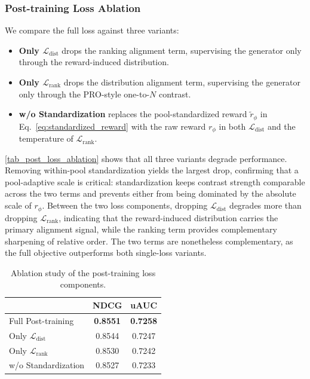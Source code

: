 \documentclass[sigconf]{acmart}
\begin{document}
\subsubsection{Post-training Loss Ablation}
We compare the full loss against three variants:
\begin{itemize}
    \item \textbf{Only $\mathcal{L}_{\mathrm{dist}}$} drops the ranking alignment term, supervising the generator only through the reward-induced distribution.
    \item \textbf{Only $\mathcal{L}_{\mathrm{rank}}$} drops the distribution alignment term, supervising the generator only through the PRO-style one-to-$N$ contrast.
    \item \textbf{w/o Standardization} replaces the pool-standardized reward $\tilde{r}_\phi$ in Eq.~\eqref{eq:standardized_reward} with the raw reward $r_\phi$ in both $\mathcal{L}_{\mathrm{dist}}$ and the temperature of $\mathcal{L}_{\mathrm{rank}}$.
\end{itemize}
\autoref{tab_post_loss_ablation} shows that all three variants degrade performance. Removing within-pool standardization yields the largest drop, confirming that a pool-adaptive scale is critical: standardization keeps contrast strength comparable across the two terms and prevents either from being dominated by the absolute scale of $r_\phi$. Between the two loss components, dropping $\mathcal{L}_{\mathrm{dist}}$ degrades more than dropping $\mathcal{L}_{\mathrm{rank}}$, indicating that the reward-induced distribution carries the primary alignment signal, while the ranking term provides complementary sharpening of relative order. The two terms are nonetheless complementary, as the full objective outperforms both single-loss variants.

\begin{table}[htpb]
\caption{Ablation study of the post-training loss components.}
\label{tab_post_loss_ablation}
\begin{tabular}{lcc}
\toprule
                                          & NDCG            & uAUC            \\
\midrule
Full Post-training                        & \textbf{0.8551} & \textbf{0.7258} \\
\midrule
Only $\mathcal{L}_{\mathrm{dist}}$        & 0.8544          & 0.7247          \\
Only $\mathcal{L}_{\mathrm{rank}}$        & 0.8530          & 0.7242          \\
w/o Standardization                       & 0.8527          & 0.7233          \\
\bottomrule
\end{tabular}
\end{table}
\end{document}
